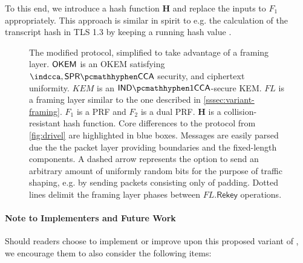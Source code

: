 To this end, we introduce a hash function $\mathbf{H}$ and replace the inputs to $F_1$ appropriately. This approach is similar in spirit to e.g. the calculation of the transcript hash in TLS 1.3 by keeping a running hash value \cite[Section~4.4.1]{rfc8446}.

\begin{figure}
    
    \caption[
        The modified \drivel{} protocol, simplified to take advantage of a framing layer.
    ]{
        The modified \drivel{} protocol, simplified to take advantage of a framing layer.
        $\mathsf{OKEM}$ is an OKEM satisfying $\indcca, \sprcca$ security, and ciphertext uniformity.
        $KEM$ is an $\indonecca$-secure KEM.
        $FL$ is a framing layer similar to the one described in \cref{sssec:variant-framing}.
        $F_1$ is a PRF and $F_2$ is a dual PRF.
        $\mathbf{H}$ is a collision-resistant hash function.
        Core differences to the \drivel{} protocol from \cref{fig:drivel} are highlighted in blue boxes.
        Messages are easily parsed due the the packet layer providing boundaries and the fixed-length components.
        A dashed arrow represents the option to send an arbitrary amount of uniformly random bits for the purpose of traffic shaping, e.g. by sending packets consisting only of padding.
        Dotted lines delimit the framing layer phases between $FL.\mathsf{Rekey}$ operations.
    }
    \label{fig:modified-drivel-framing}
\end{figure}

\paragraph{Note to Implementers and Future Work}

Should readers choose to implement or improve upon this proposed variant of \drivel{}, we encourage them to also consider the following items:

